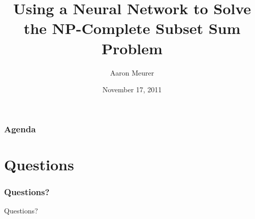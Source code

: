 \documentclass{beamer}
\title{Using a Neural Network to Solve the NP-Complete Subset Sum Problem}
\author{Aaron Meurer}
\date{November 17, 2011}
\numberwithin{equation}{section} %
\begin{document}
\begin{frame}
    \titlepage
\end{frame}

\begin{frame} 
    \frametitle{Agenda} 
    \tableofcontents 
\end{frame} 

\section{Questions}

\begin{frame}
    \frametitle{Questions?}
    \huge{Questions?}
\end{frame}
\end{document}
